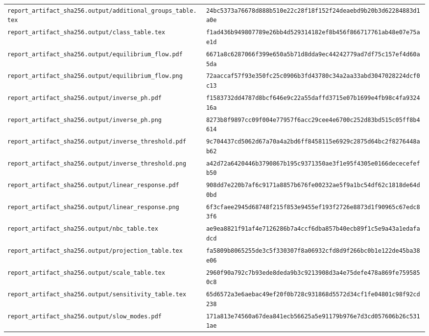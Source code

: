 \begin{longtable}{p{.46\linewidth}p{.46\linewidth}}
\nolinkurl{report_artifact_sha256.output/additional_groups_table.tex} & \nolinkurl{24bc5373a76678d888b510e22c28f18f152f24deaebd9b20b3d62284883d1a0e} \\
\nolinkurl{report_artifact_sha256.output/class_table.tex} & \nolinkurl{f1ad436b949807789e26bb4d529314182ef8b456f866717761ab48e07e75ae1d} \\
\nolinkurl{report_artifact_sha256.output/equilibrium_flow.pdf} & \nolinkurl{6671a8c6287066f399e650a5b71d8dda9ec44242779ad7df75c157ef4d60a5da} \\
\nolinkurl{report_artifact_sha256.output/equilibrium_flow.png} & \nolinkurl{72aaccaf57f93e350fc25c0906b3fd43780c34a2aa33abd3047028224dcf0c13} \\
\nolinkurl{report_artifact_sha256.output/inverse_ph.pdf} & \nolinkurl{f1583732dd4787d8bcf646e9c22a55daffd3715e07b1699e4fb98c4fa932416a} \\
\nolinkurl{report_artifact_sha256.output/inverse_ph.png} & \nolinkurl{8273b8f9897cc09f004e77957f6acc29cee4e6700c252d83bd515c05ff8b4614} \\
\nolinkurl{report_artifact_sha256.output/inverse_threshold.pdf} & \nolinkurl{9c704437cd5062d67a70a4a2bd6ff8458115e6929c2875d64bc2f8276448ab62} \\
\nolinkurl{report_artifact_sha256.output/inverse_threshold.png} & \nolinkurl{a42d72a6420446b3790867b195c9371350ae3f1e95f4305e0166dececefefb50} \\
\nolinkurl{report_artifact_sha256.output/linear_response.pdf} & \nolinkurl{908dd7e220b7af6c9171a8857b676fe00232ae5f9a1bc54df62c1818de64d0bd} \\
\nolinkurl{report_artifact_sha256.output/linear_response.png} & \nolinkurl{6f3cfaee2945d68748f215f853e9455ef193f2726e8873d1f90965c67edc83f6} \\
\nolinkurl{report_artifact_sha256.output/nbc_table.tex} & \nolinkurl{ae9ea8821f91af4e7126286b7a4ccf6dba857b40ecb89f1c5e9a43a1edafadcd} \\
\nolinkurl{report_artifact_sha256.output/projection_table.tex} & \nolinkurl{fa5809b8065255de3c5f330307f8a06932cfd8d9f266bc0b1e122de45ba38e06} \\
\nolinkurl{report_artifact_sha256.output/scale_table.tex} & \nolinkurl{2960f90a792c7b93ede8deda9b3c9213908d3a4e75defe478a869fe7595850c8} \\
\nolinkurl{report_artifact_sha256.output/sensitivity_table.tex} & \nolinkurl{65d6572a3e6aebac49ef20f0b728c931868d5572d34cf1fe04801c98f92cd238} \\
\nolinkurl{report_artifact_sha256.output/slow_modes.pdf} & \nolinkurl{171a813e74560a67dea841ecb56625a5e91179b976e7d3cd057606b26c5311ae} \\

\end{longtable}
